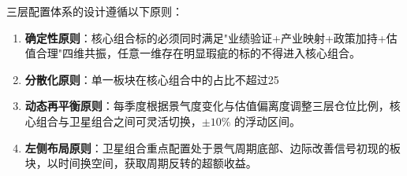 三层配置体系的设计遵循以下原则：

\vspace{0.2em}
\begin{enumerate}[leftmargin=2em]
\item \textbf{确定性原则}：核心组合标的必须同时满足"业绩验证+产业映射+政策加持+估值合理"四维共振，任意一维存在明显瑕疵的标的不得进入核心组合。
\item \textbf{分散化原则}：单一板块在核心组合中的占比不超过25%
\item \textbf{动态再平衡原则}：每季度根据景气度变化与估值偏离度调整三层仓位比例，核心组合与卫星组合之间可灵活切换，$\pm{}10\%$ 的浮动区间。
\item \textbf{左侧布局原则}：卫星组合重点配置处于景气周期底部、边际改善信号初现的板块，以时间换空间，获取周期反转的超额收益。
\end{enumerate}

